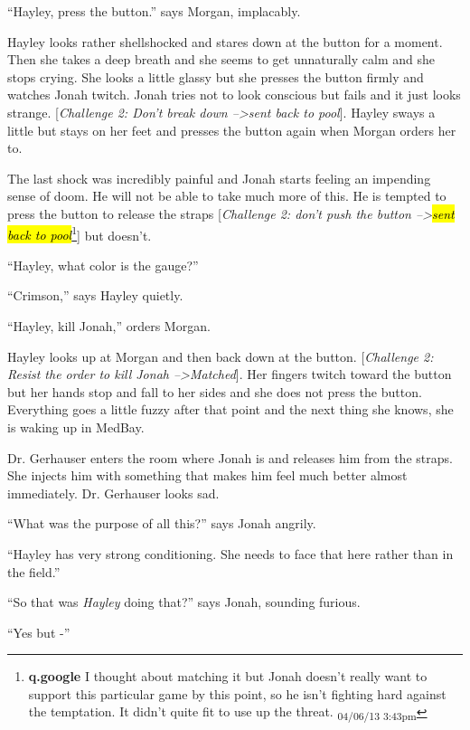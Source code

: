 ``Hayley, press the button.'' says Morgan, implacably.

Hayley looks rather shellshocked and stares down at the button for a moment.  Then she takes a deep breath and she seems to get unnaturally calm and she stops crying.  She looks a little glassy but she presses the button firmly and watches Jonah twitch.  Jonah tries not to look conscious but fails and it just looks strange.  {[}\textit{Challenge 2: Don't break down --\textgreater  sent back to pool}{]}. Hayley sways a little but stays on her feet and presses the button again when Morgan orders her to.



The last shock was incredibly painful and Jonah starts feeling an impending sense of doom. He will not be able to take much more of this.  He is tempted to press the button to release the straps {[}\textit{Challenge 2: don't push the button --\textgreater  }\textit{\hl{sent back to pool}}\footnote{\textbf{q.google }I thought about matching it but Jonah doesn't really want to support this particular game by this point, so he isn't fighting hard against the temptation.  It didn't quite fit to use up the threat. \textsubscript{04/06/13 3:43pm}}{]} but doesn't.



``Hayley, what color is the gauge?''

``Crimson,'' says Hayley quietly.

``Hayley, kill Jonah,'' orders Morgan.

Hayley looks up at Morgan and then back down at the button.  {[}\textit{Challenge 2: Resist the order to kill Jonah --\textgreater  Matched}{]}.  Her fingers twitch toward the button but her hands stop and fall to her sides and she does not press the button.  Everything goes a little fuzzy after that point and the next thing she knows, she is waking up in MedBay.



Dr. Gerhauser enters the room where Jonah is and releases him from the straps. She injects him with something that makes him feel much better almost immediately.  Dr. Gerhauser looks sad.

``What was the purpose of all this?'' says Jonah angrily.

``Hayley has very strong conditioning.  She needs to face that here rather than in the field.''

``So that was \textit{Hayley} doing that?'' says Jonah, sounding furious.

``Yes but -''

